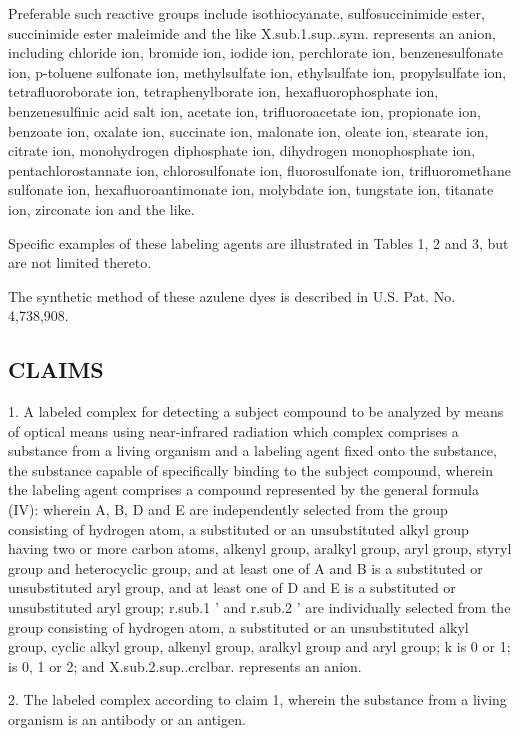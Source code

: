\documentclass[11pt,a4paper]{article}
\begin{document}
Preferable such reactive groups include isothiocyanate, sulfosuccinimide ester, succinimide ester maleimide and the like X.sub.1.sup..sym. represents an anion, including chloride ion, bromide ion, iodide ion, perchlorate ion, benzenesulfonate ion, p-toluene sulfonate ion, methylsulfate ion, ethylsulfate ion, propylsulfate ion, tetrafluoroborate ion, tetraphenylborate ion, hexafluorophosphate ion, benzenesulfinic acid salt ion, acetate ion, trifluoroacetate ion, propionate ion, benzoate ion, oxalate ion, succinate ion, malonate ion, oleate ion, stearate ion, citrate ion, monohydrogen diphosphate ion, dihydrogen monophosphate ion, pentachlorostannate ion, chlorosulfonate ion, fluorosulfonate ion, trifluoromethane sulfonate ion, hexafluoroantimonate ion, molybdate ion, tungstate ion, titanate ion, zirconate ion and the like.

Specific examples of these labeling agents are illustrated in Tables 1, 2 and 3, but are not limited thereto.

The synthetic method of these azulene dyes is described in U.S. Pat. No. 4,738,908.

\subsection{CLAIMS}

1. A labeled complex for detecting a subject compound to be analyzed by means of optical means using near-infrared radiation which complex comprises a substance from a living organism and a labeling agent fixed onto the substance, the substance capable of specifically binding to the subject compound, wherein the labeling agent comprises a compound represented by the general formula (IV): wherein A, B, D and E are independently selected from the group consisting of hydrogen atom, a substituted or an unsubstituted alkyl group having two or more carbon atoms, alkenyl group, aralkyl group, aryl group, styryl group and heterocyclic group, and at least one of A and B is a substituted or unsubstituted aryl group, and at least one of D and E is a substituted or unsubstituted aryl group; r.sub.1 ' and r.sub.2 ' are individually selected from the group consisting of hydrogen atom, a substituted or an unsubstituted alkyl group, cyclic alkyl group, alkenyl group, aralkyl group and aryl group; k is 0 or 1; is 0, 1 or 2; and X.sub.2.sup..crclbar.  represents an anion.

2. The labeled complex according to claim 1, wherein the substance from a living organism is an antibody or an antigen.
\end{document}
